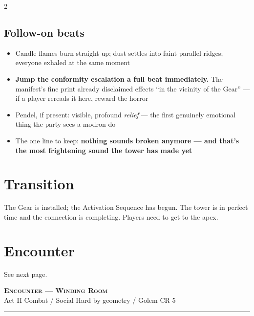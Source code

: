 \documentclass[10pt,letterpaper]{article}
\newcommand{\sceneheader}[4]{%
  \fancyhead[L]{\small\textcolor{accent}{\scshape #1}}%
  \fancyhead[R]{\small\textcolor{accent}{#2 \quad \textbullet \quad #3}}%
  \begin{center}
  {\LARGE\bfseries\scshape\textcolor{accent}{#1}}\\[2pt]
  {\small #2 \quad \textbullet \quad #3 \quad \textbullet \quad #4}\\[2pt]
  \textcolor{rulecol}{\rule{0.5\textwidth}{0.8pt}}
  \end{center}
  \vspace{-4pt}
}
\begin{document}
\begin{multicols}{2}
\subsection*{Follow-on beats}
\begin{itemize}
\item Candle flames burn straight up; dust settles into faint parallel ridges; everyone exhaled at the same moment
\item \textbf{Jump the conformity escalation a full beat immediately.} The manifest's fine print already disclaimed effects ``in the vicinity of the Gear'' --- if a player rereads it here, reward the horror
\item Pendel, if present: visible, profound \textit{relief} --- the first genuinely emotional thing the party sees a modron do
\item The one line to keep: \textbf{nothing sounds broken anymore --- and that's the most frightening sound the tower has made yet}
\end{itemize}

\section*{Transition}
The Gear is installed; the Activation Sequence has begun. The tower is in perfect time and the connection is completing. Players need to get to the apex.

\section*{Encounter}
See next page.

\end{multicols}

\newpage


\label{sec:enc-gearroom}\sceneheader{Encounter --- Winding Room}{Act II}{Combat / Social}{Hard by geometry / Golem CR 5}
\end{document}
